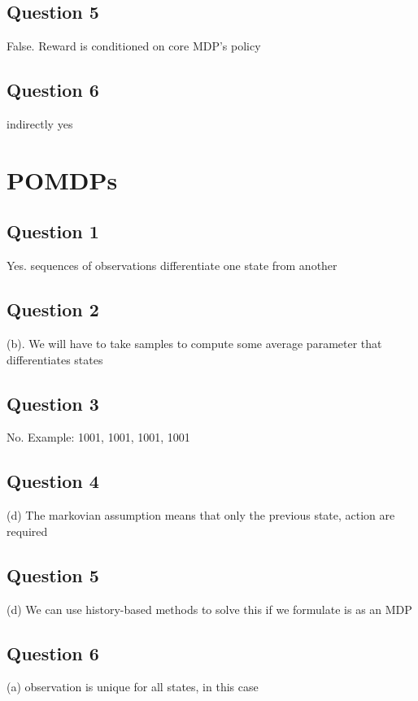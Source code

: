 \documentclass[12pt]{extarticle}
\begin{document}
\subsection{Question 5}
False. Reward is conditioned on core MDP's policy

\subsection{Question 6}
indirectly yes

\section{POMDPs}
\subsection{Question 1}
Yes. sequences of observations differentiate one state from another

\subsection{Question 2}
(b). We will have to take samples to compute some average parameter that differentiates states

\subsection{Question 3}
No. Example: 1001, 1001, 1001, 1001

\subsection{Question 4}
(d) The markovian assumption means that only the previous state, action are required

\subsection{Question 5}
(d) We can use history-based methods to solve this if we formulate is as an MDP

\subsection{Question 6}
(a) observation is unique for all states, in this case
\end{document}
